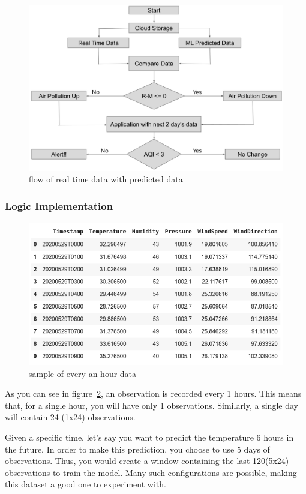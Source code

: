 \begin{figure}[!ht]
\centering
\includegraphics[width=\linewidth]{figures/ml-flow-chart.png}
\caption{\label{img43} flow of real time data with predicted data}
\end{figure}

\subsubsection{Logic Implementation}

\begin{figure}[!ht]
\centering
\includegraphics[width=\linewidth]{figures/sample-data.png}
\caption{\label{img44} sample of every an hour data}
\end{figure}

As you can see in figure~\ref{img44}, an observation is recorded every 1 hours. This means that, for a single hour, you will have only 1 observations. Similarly, a single day will contain 24 (1x24) observations.

Given a specific time, let's say you want to predict the temperature 6 hours in the future. In order to make this prediction, you choose to use 5 days of observations. Thus, you would create a window containing the last 120(5x24) observations to train the model. Many such configurations are possible, making this dataset a good one to experiment with.

